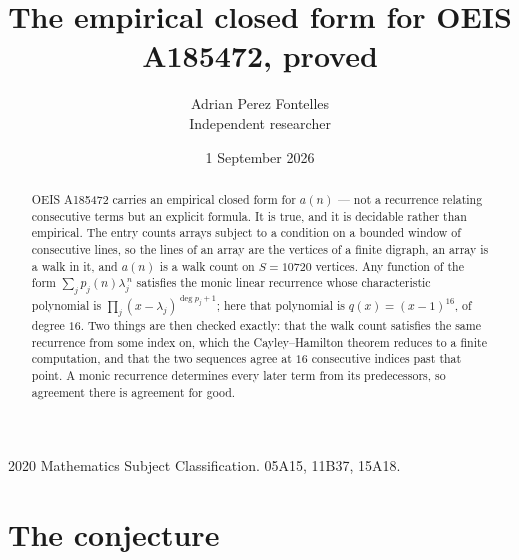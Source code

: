 \documentclass[11pt,a4paper]{article}
\title{The empirical closed form for OEIS A185472, proved}
\author{Adrian Perez Fontelles\\ \small Independent researcher}
\date{1 September 2026}
\theoremstyle{plain}
\theoremstyle{definition}
\begin{document}
\maketitle

\begin{abstract}
OEIS A185472 carries an empirical closed form for $a(n)$ --- not a recurrence relating
consecutive terms but an explicit formula. It is true, and it is decidable rather than
empirical. The entry counts arrays subject to a condition on a bounded window of consecutive lines, so the lines of an array are the
vertices of a finite digraph, an array is a walk in it, and $a(n)$ is a walk count on
$S=10720$ vertices. Any function of the form $\sum_j p_j(n)\lambda_j^{\,n}$ satisfies the
monic linear recurrence whose characteristic polynomial is
$\prod_j(x-\lambda_j)^{\deg p_j+1}$; here that polynomial is $q(x)=(x-1)^{16}$, of degree
$16$. Two things are then checked exactly: that the walk count satisfies the same
recurrence from some index on, which the Cayley--Hamilton theorem reduces to a finite
computation, and that the two sequences agree at $16$ consecutive indices past that
point. A monic recurrence determines every later term from its predecessors, so agreement
there is agreement for good.
\end{abstract}

\noindent\small 2020 Mathematics Subject Classification. 05A15, 11B37, 15A18.\normalsize

\section{The conjecture}
\end{document}
